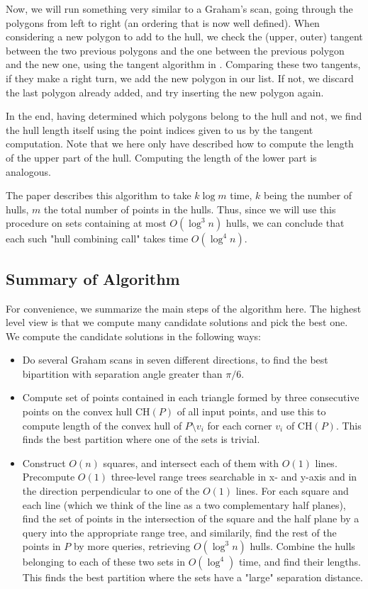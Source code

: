 \documentclass{article}
\begin{document}
Now, we will run something very similar to a Graham's scan, going through the polygons from left to right (an ordering that is now well defined). When considering a new polygon to add to the hull, we check the (upper, outer) tangent between the two previous polygons and the one between the previous polygon and the new one, using the tangent algorithm in \cite{ks95}. Comparing these two tangents, if they make a right turn, we add the new polygon in our list. If not, we discard the last polygon  already added, and try inserting the new polygon again.

In the end, having determined which polygons belong to the hull and not, we find the hull length itself using the point indices given to us by the tangent computation. Note that we here only have described how to compute the length of the upper part of the hull. Computing the length of the lower part is analogous. 

The paper \cite{abb17} describes this algorithm to take $k \log m$ time, $k$ being the number of hulls, $m$ the total number of points in the hulls. Thus, since we will use this procedure on sets containing at most $O(\log^3 n)$ hulls, we can conclude that each such "hull combining call" takes time $O(\log^4 n)$.

\subsection{Summary of Algorithm}

For convenience, we summarize the main steps of the algorithm here. The highest level view is that we compute many candidate solutions and pick the best one. We compute the candidate solutions in the following ways:

\begin{itemize}
    \item Do several Graham scans in seven different directions, to find the best bipartition with separation angle greater than $\pi / 6$.
    \item Compute set of points contained in each triangle formed by three consecutive points on the convex hull $\text{CH}(P)$ of all input points, and use this to compute length of the convex hull of $P \setminus v_i$ for each corner $v_i$ of $\text{CH}(P)$. This finds the best partition where one of the sets is trivial.
    \item Construct $O(n)$ squares, and intersect each of them with $O(1)$ lines. Precompute $O(1)$ three-level range trees searchable in x- and y-axis and in the direction perpendicular to one of the $O(1)$ lines. For each square and each line (which we think of the line as a two complementary half planes), find the set of points in the intersection of the square and the half plane by a query into the appropriate range tree, and similarily, find the rest of the points in $P$ by more queries, retrieving $O(\log^3 n)$ hulls. Combine the hulls belonging to each of these two sets in $O(\log^4)$ time, and find their lengths. This finds the best partition where the sets have a "large" separation distance.
\end{itemize}
\end{document}
